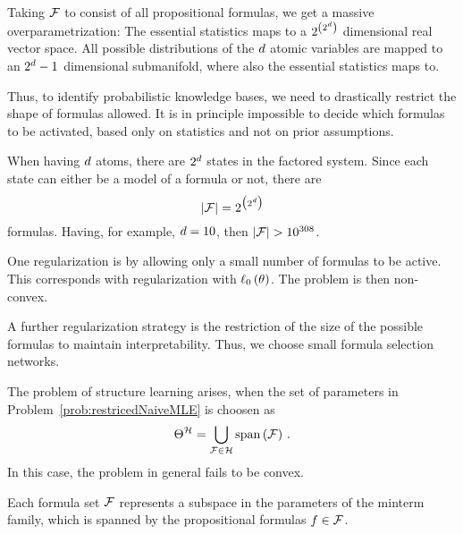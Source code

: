 \begin{remark}[Overparametrization]
    Taking $\mathcal{F}$ to consist of all propositional formulas, we get a massive overparametrization:
    The essential statistics maps to a $2^{\left(2^d \right)}$ dimensional real vector space.
    All possible distributions of the $d$ atomic variables are mapped to an $2^d-1$ dimensional submanifold, where also the essential statistics maps to.

    Thus, to identify probabilistic knowledge bases, we need to drastically restrict the shape of formulas allowed.
    It is in principle impossible to decide which formulas to be activated, based only on statistics and not on prior assumptions.

    When having $d$ atoms, there are $2^{d}$ states in the factored system.
    Since each state can either be a model of a formula or not, there are
    \[ \left|\mathcal{F}\right| = 2^{\big(2^d \big)} \]
    formulas.
    Having, for example, $d=10$, then $\cardof{\formulaset}>10^{308}$.


    One regularization is by allowing only a small number of formulas to be active.
    This corresponds with regularization with $\ell_0\left(\theta\right)$.
    The problem is then non-convex.


    A further regularization strategy is the restriction of the size of the possible formulas to maintain interpretability.
    Thus, we choose small formula selection networks.
\end{remark}





The problem of structure learning arises, when the set of parameters in Problem~\ref{prob:restricedNaiveMLE} is choosen as
\[ \Theta^{\mathcal{H}}= \bigcup_{\mathcal{F}\in\mathcal{H}} \mathrm{span}\left(\mathcal{F}\right) \, .  \] %
In this case, the problem in general fails to be convex.

Each formula set $\mathcal{F}$ represents a subspace in the parameters of the minterm family, which is spanned by the propositional formulas $f\in\mathcal{F}$.

